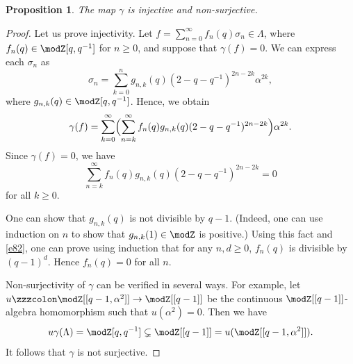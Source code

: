 \documentclass{amsart}
\numberwithin{equation}{section}
\numberwithin{figure}{section}
\theoremstyle{plain}
\newtheorem{proposition}[theorem]{Proposition}
\theoremstyle{definition}
\theoremstyle{remark}
\begin{document}
\begin{proposition}
  \label{r72}
  The map $\gamma $ is injective and non-surjective.
\end{proposition}

\begin{proof}
  Let us prove injectivity.
  Let $f=\sum_{n=0}^\infty f_n(q)\sigma _n\in \Lambda $, where $f_n(q)\in \modZ [q,q^{-1}]$ for
  $n\ge 0$, and suppose that $\gamma (f)=0$.  We can express each $\sigma _n$ as
  \begin{equation*}
    \sigma _n= \sum_{k=0}^n g_{n,k}(q)(2-q-q^{-1})^{2n-2k}\alpha ^{2k},
  \end{equation*}
  where $g_{n,k}(q)\in \modZ [q,q^{-1}]$.  Hence, we obtain
  \begin{equation*}
    \gamma (f)=\sum_{k=0}^\infty 
    \Bigl(\sum_{n=k}^\infty f_n(q)g_{n,k}(q)(2-q-q^{-1})^{2n-2k}\Bigr)\alpha ^{2k}.
  \end{equation*}
  Since $\gamma (f)=0$, we have
  \begin{equation}
    \label{e82}
    \sum_{n=k}^\infty f_n(q)g_{n,k}(q)(2-q-q^{-1})^{2n-2k}=0
  \end{equation}
  for all $k\ge 0$.

  One can show that $g_{n,k}(q)$ is not divisible by $q-1$.  (Indeed,
  one can use induction on $n$ to show that $g_{n,k}(1)\in \modZ $ is
  positive.)  Using this fact and \eqref{e82}, one can prove using
  induction that for any $n,d\ge 0$, $f_n(q)$ is divisible by $(q-1)^d$.
  Hence $f_n(q)=0$ for all $n$.

  Non-surjectivity of $\gamma $ can be verified in several ways.  For
  example, let $u\zzzcolon \modZ [[q-1,\alpha ^2]]\rightarrow \modZ [[q-1]]$ be the continuous
  $\modZ [[q-1]]$-algebra homomorphism such that $u(\alpha ^2)=0$.  Then we
  have
  \begin{equation*}
    u\gamma (\Lambda )=\modZ [q,q^{-1}]\subsetneq\modZ [[q-1]]=u(\modZ [[q-1,\alpha ^2]]).
  \end{equation*}
  It follows that $\gamma $ is not surjective.
\end{proof}
\end{document}
